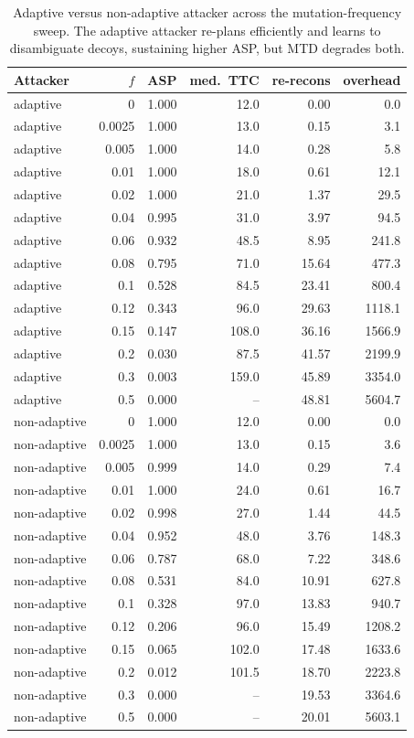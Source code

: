 \begin{table}[t]
\centering
\caption{Adaptive versus non-adaptive attacker across the mutation-frequency sweep. The adaptive attacker re-plans efficiently and learns to disambiguate decoys, sustaining higher ASP, but MTD degrades both.}
\label{tab:adaptive_vs_nonadaptive}
\begin{tabular}{lrrrrr}
\toprule
Attacker & $f$ & ASP & med.\ TTC & re-recons & overhead \\
\midrule
adaptive & 0 & 1.000 & 12.0 & 0.00 & 0.0 \\
adaptive & 0.0025 & 1.000 & 13.0 & 0.15 & 3.1 \\
adaptive & 0.005 & 1.000 & 14.0 & 0.28 & 5.8 \\
adaptive & 0.01 & 1.000 & 18.0 & 0.61 & 12.1 \\
adaptive & 0.02 & 1.000 & 21.0 & 1.37 & 29.5 \\
adaptive & 0.04 & 0.995 & 31.0 & 3.97 & 94.5 \\
adaptive & 0.06 & 0.932 & 48.5 & 8.95 & 241.8 \\
adaptive & 0.08 & 0.795 & 71.0 & 15.64 & 477.3 \\
adaptive & 0.1 & 0.528 & 84.5 & 23.41 & 800.4 \\
adaptive & 0.12 & 0.343 & 96.0 & 29.63 & 1118.1 \\
adaptive & 0.15 & 0.147 & 108.0 & 36.16 & 1566.9 \\
adaptive & 0.2 & 0.030 & 87.5 & 41.57 & 2199.9 \\
adaptive & 0.3 & 0.003 & 159.0 & 45.89 & 3354.0 \\
adaptive & 0.5 & 0.000 & -- & 48.81 & 5604.7 \\
non-adaptive & 0 & 1.000 & 12.0 & 0.00 & 0.0 \\
non-adaptive & 0.0025 & 1.000 & 13.0 & 0.15 & 3.6 \\
non-adaptive & 0.005 & 0.999 & 14.0 & 0.29 & 7.4 \\
non-adaptive & 0.01 & 1.000 & 24.0 & 0.61 & 16.7 \\
non-adaptive & 0.02 & 0.998 & 27.0 & 1.44 & 44.5 \\
non-adaptive & 0.04 & 0.952 & 48.0 & 3.76 & 148.3 \\
non-adaptive & 0.06 & 0.787 & 68.0 & 7.22 & 348.6 \\
non-adaptive & 0.08 & 0.531 & 84.0 & 10.91 & 627.8 \\
non-adaptive & 0.1 & 0.328 & 97.0 & 13.83 & 940.7 \\
non-adaptive & 0.12 & 0.206 & 96.0 & 15.49 & 1208.2 \\
non-adaptive & 0.15 & 0.065 & 102.0 & 17.48 & 1633.6 \\
non-adaptive & 0.2 & 0.012 & 101.5 & 18.70 & 2223.8 \\
non-adaptive & 0.3 & 0.000 & -- & 19.53 & 3364.6 \\
non-adaptive & 0.5 & 0.000 & -- & 20.01 & 5603.1 \\
\bottomrule
\end{tabular}
\end{table}
